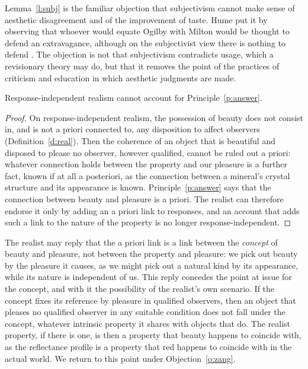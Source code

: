 \documentclass{situationist-preprint}
\begin{document}
Lemma~\ref{l:subj} is the familiar objection that subjectivism cannot make sense of aesthetic disagreement and of the improvement of taste. Hume put it by observing that whoever would equate Ogilby with Milton would be thought to defend an extravagance, although on the subjectivist view there is nothing to defend \citep{Hume1757}. The objection is not that subjectivism contradicts usage, which a revisionary theory may do, but that it removes the point of the practices of criticism and education in which aesthetic judgments are made.

\begin{lemma}\label{l:real}
Response-independent realism cannot account for Principle~\ref{p:answer}.
\end{lemma}

\begin{proof}
On response-independent realism, the possession of beauty does not consist in, and is not a priori connected to, any disposition to affect observers (Definition~\ref{d:real}). Then the coherence of an object that is beautiful and disposed to please no observer, however qualified, cannot be ruled out a priori: whatever connection holds between the property and our pleasure is a further fact, known if at all a posteriori, as the connection between a mineral's crystal structure and its appearance is known. Principle~\ref{p:answer} says that the connection between beauty and pleasure is a priori. The realist can therefore endorse it only by adding an a priori link to responses, and an account that adds such a link to the nature of the property is no longer response-independent.
\end{proof}

The realist may reply that the a priori link is a link between the \emph{concept} of beauty and pleasure, not between the property and pleasure: we pick out beauty by the pleasure it causes, as we might pick out a natural kind by its appearance, while its nature is independent of us. This reply concedes the point at issue for the concept, and with it the possibility of the realist's own scenario. If the concept fixes its reference by pleasure in qualified observers, then an object that pleases no qualified observer in any suitable condition does not fall under the concept, whatever intrinsic property it shares with objects that do. The realist property, if there is one, is then a property that beauty happens to coincide with, as the reflectance profile is a property that red happens to coincide with in the actual world. We return to this point under Objection~\ref{o:zang}.
\end{document}
